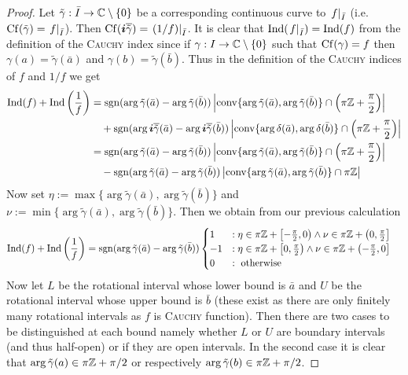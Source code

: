 \message{ !name(On The Routh-Hurwitz Theorem.tex)}\documentclass[10pt,a4paper]{article}
\begin{document}
\begin{proof}
Let $\tilde{\gamma}:\bar{I}\rightarrow\mathbb{C}\setminus\{0\}$ be a corresponding continuous curve to $\left. f\right\vert_{\bar{I}}$ (i.e. $\operatorname{Cf}(\tilde{\gamma})=\left. f\right\vert_{\bar{I}}$). Then $\operatorname{Cf}(\boldsymbol{i}\overline{\tilde{\gamma}})=\left. (1/f)\right\vert_{\bar{I}}$. It is clear that $\operatorname{Ind}(\left. f\right\vert_{\bar{I}})=\operatorname{Ind}(f)$ from the definition of the \textsc{Cauchy} index since if $\gamma:I\rightarrow\mathbb{C}\setminus\{0\}$ such that $\operatorname{Cf}(\gamma)=f$ then $\gamma(a)=\tilde{\gamma}(\bar{a})$ and $\gamma(b)=\tilde{\gamma}(\bar{b})$. 
Thus in the definition of the \textsc{Cauchy} indices of $f$ and $1/f$ we get
\begin{align}
\operatorname{Ind}(f)+\operatorname{Ind}\left(\frac{1}{f}\right) & =\operatorname{sgn}(\arg{\tilde{\gamma}(\bar{a})}-\arg{\tilde{\gamma}(\bar{b})})\left|\operatorname{conv}\{\arg{\tilde{\gamma}(\bar{a})},\arg{\tilde{\gamma}(\bar{b})}\}\cap\left(\pi\mathbb{Z}+\frac{\pi}{2}\right)\right|\\
& \quad+\operatorname{sgn}(\arg{\boldsymbol{i}\overline{\tilde{\gamma}}(\bar{a})}-\arg{\boldsymbol{i}\overline{\tilde{\gamma}}(\bar{b})})\left|\operatorname{conv}\{\arg{\delta(\bar{a})},\arg{\delta(\bar{b})}\}\cap\left(\pi\mathbb{Z}+\frac{\pi}{2}\right)\right|\\
& = \operatorname{sgn}(\arg{\tilde{\gamma}(\bar{a})}-\arg{\tilde{\gamma}(\bar{b})})\left|\operatorname{conv}\{\arg{\tilde{\gamma}(\bar{a})},\arg{\tilde{\gamma}(\bar{b})}\}\cap\left(\pi\mathbb{Z}+\frac{\pi}{2}\right)\right|\\
& \quad -\operatorname{sgn}(\arg{\tilde{\gamma}(\bar{a})}-\arg{\tilde{\gamma}(\bar{b})})\left|\operatorname{conv}\{\arg{\tilde{\gamma}(\bar{a})},\arg{\tilde{\gamma}(\bar{b})}\}\cap\pi\mathbb{Z}\right|
\end{align}
Now set $\eta:=\max\{\arg{\tilde{\gamma}(\bar{a})},\arg{\tilde{\gamma}(\bar{b})}\}$ and $\nu:=\min\{\arg{\tilde{\gamma}(\bar{a})},\arg{\tilde{\gamma}(\bar{b})}\}$. Then we obtain from our previous calculation
\begin{align}
\operatorname{Ind}(f)+\operatorname{Ind}\left(\frac{1}{f}\right) & = \operatorname{sgn}(\arg{\tilde{\gamma}(\bar{a})}-\arg{\tilde{\gamma}(\bar{b})})\begin{cases}
1 	&: \eta\in\pi\mathbb{Z}+\left[-\frac{\pi}{2},0\right)\wedge\nu\in\pi\mathbb{Z}+\left(0,\frac{\pi}{2}\right]\\
-1 	&: \eta\in\pi\mathbb{Z}+\left[0,\frac{\pi}{2}\right)\wedge\nu\in\pi\mathbb{Z}+\left(-\frac{\pi}{2},0\right]\\
0	&: \text{ otherwise }
\end{cases}
\end{align}
Now let $L$ be the rotational interval whose lower bound is $\bar{a}$ and $U$ be the rotational interval whose upper bound is $\bar{b}$ (these exist as there are only finitely many rotational intervals as $f$ is \textsc{Cauchy} function). Then there are two cases to be distinguished at each bound namely whether $L$ or $U$ are boundary intervals (and thus half-open) or if they are open intervals. In the second case it is clear that $\arg{\tilde{\gamma}(a)}\in\pi\mathbb{Z}+\pi/2$ or respectively $\arg{\tilde{\gamma}(b)}\in\pi\mathbb{Z}+\pi/2$.

\end{proof}
\end{document}
